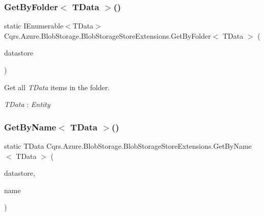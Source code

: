 \subsubsection{\texorpdfstring{Get\+By\+Folder$<$ T\+Data $>$()}{GetByFolder< TData >()}\hspace{0.1cm}{\footnotesize\ttfamily [2/2]}}
{\footnotesize\ttfamily static I\+Enumerable$<$T\+Data$>$ Cqrs.\+Azure.\+Blob\+Storage.\+Blob\+Storage\+Store\+Extensions.\+Get\+By\+Folder$<$ T\+Data $>$ (\begin{DoxyParamCaption}\item[{this \hyperlink{interfaceCqrs_1_1DataStores_1_1IDataStore}{I\+Data\+Store}$<$ T\+Data $>$}]{datastore }\end{DoxyParamCaption})\hspace{0.3cm}{\ttfamily [static]}}



Get all {\itshape T\+Data}  items in the folder. 

\begin{Desc}
\item[Type Constraints]\begin{description}
\item[{\em T\+Data} : {\em Entity}]\end{description}
\end{Desc}
\mbox{\label{classCqrs_1_1Azure_1_1BlobStorage_1_1BlobStorageStoreExtensions_a05556de9a118a0be43dd328b29591d2d_a05556de9a118a0be43dd328b29591d2d}} 
\subsubsection{\texorpdfstring{Get\+By\+Name$<$ T\+Data $>$()}{GetByName< TData >()}\hspace{0.1cm}{\footnotesize\ttfamily [1/2]}}
{\footnotesize\ttfamily static T\+Data Cqrs.\+Azure.\+Blob\+Storage.\+Blob\+Storage\+Store\+Extensions.\+Get\+By\+Name$<$ T\+Data $>$ (\begin{DoxyParamCaption}\item[{this \hyperlink{interfaceCqrs_1_1DataStores_1_1IDataStore}{I\+Data\+Store}$<$ T\+Data $>$}]{datastore,  }\item[{string}]{name }\end{DoxyParamCaption})\hspace{0.3cm}{\ttfamily [static]}}



